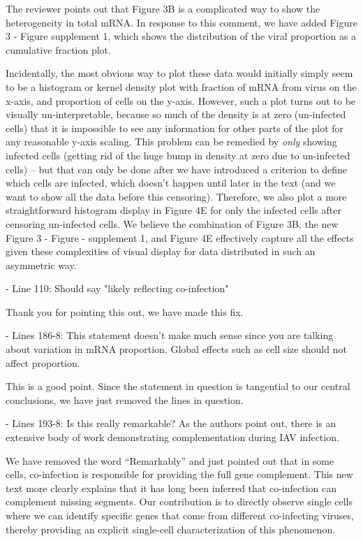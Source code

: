 \documentclass[11pt, oneside]{article}   	%
\begin{document}
{\color{black}
The reviewer points out that Figure 3B is a complicated way to show the heterogeneity in total mRNA.
In response to this comment, we have added Figure 3 - Figure supplement 1, which shows the distribution of the viral proportion as a cumulative fraction plot.

Incidentally, the most obvious way to plot these data would initially simply seem to be a histogram or kernel density plot with fraction of mRNA from virus on the x-axis, and proportion of cells on the y-axis.
However, such a plot turns out to be visually un-interpretable, because so much of the density is at zero (un-infected cells) that it is impossible to see any information for other parts of the plot for any reasonable y-axis scaling. 
This problem can be remedied by \emph{only} showing infected cells (getting rid of the huge bump in density at zero due to un-infected cells) -- but that can only be done after we have introduced a criterion to define which cells are infected, which doesn't happen until later in the text (and we want to show all the data before this censoring).
Therefore, we also plot a more straightforward histogram display in Figure 4E for only the infected cells after censoring un-infected cells.
We believe the combination of Figure 3B, the new Figure 3 - Figure - supplement 1, and Figure 4E effectively capture all the effects given these complexities of visual display for data distributed in such an asymmetric way.
}

- Line 110: Should say "likely reflecting co-infection" 

{\color{black}
Thank you for pointing this out, we have made this fix.}

- Lines 186-8: This statement doesn't make much sense since you are talking about variation in mRNA proportion. Global effects such as cell size should not affect proportion. 

{\color{black}
This is a good point. 
Since the statement in question is tangential to our central conclusions, we have just removed the lines in question.
}

- Lines 193-8: Is this really remarkable? As the authors point out, there is an extensive body of work demonstrating complementation during IAV infection. 

{\color{black} 
We have removed the word ``Remarkably'' and just pointed out that in some cells, co-infection is responsible for providing the full gene complement.
This new text more clearly explains that it has long been inferred that co-infection can complement missing segments.
Our contribution is to directly observe single cells where we can identify specific genes that come from different co-infecting viruses, thereby providing an explicit single-cell characterization of this phenomenon. 
}
\end{document}
